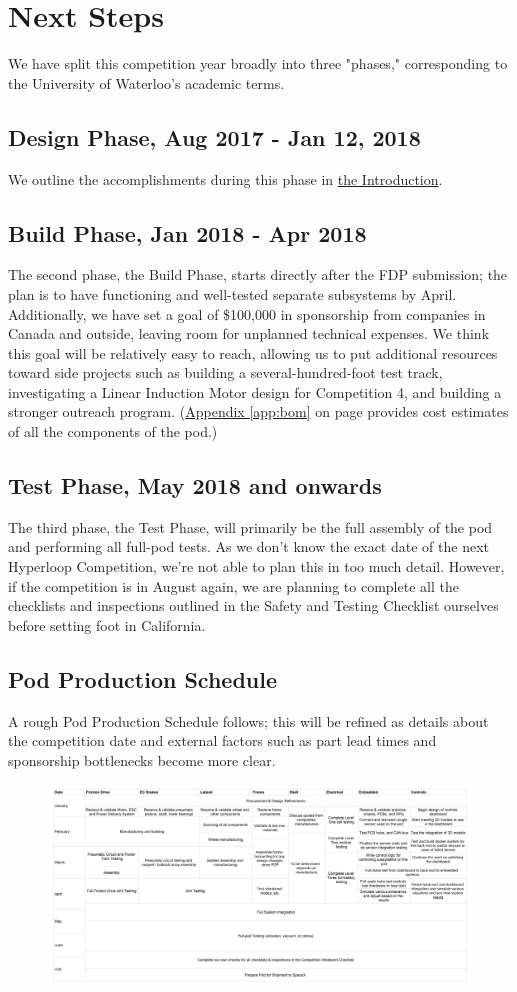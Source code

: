 \documentclass[main.tex]{subfiles}
\begin{document}
    \chapter{Next Steps}
    \label{ch:next-steps}
    We have split this competition year broadly into three "phases," corresponding to the University of Waterloo's academic terms.
    
    \section{Design Phase, Aug 2017 - Jan 12, 2018}
    We outline the accomplishments during this phase in \hyperref[ch:intro]{the Introduction}.
    
    \section{Build Phase, Jan 2018 - Apr 2018}
    The second phase, the Build Phase, starts directly after the FDP submission; the plan is to have functioning and well-tested separate subsystems by April. Additionally, we have set a goal of \$100,000 in sponsorship from companies in Canada and outside, leaving room for unplanned technical expenses. We think this goal will be relatively easy to reach, allowing us to put additional resources toward side projects such as building a several-hundred-foot test track, investigating a Linear Induction Motor design for Competition 4, and building a stronger outreach program. (\hyperref[app:bom]{Appendix \ref{app:bom}} on page \pageref{app:bom} provides cost estimates of all the components of the pod.)
    
	\section{Test Phase, May 2018 and onwards}
    The third phase, the Test Phase, will primarily be the full assembly of the pod and performing all full-pod tests. As we don't know the exact date of the next Hyperloop Competition, we're not able to plan this in too much detail. However, if the competition is in August again, we are planning to complete all the checklists and inspections outlined in the Safety and Testing Checklist ourselves before setting foot in California.
    
    \section{Pod Production Schedule}
    A rough Pod Production Schedule follows; this will be refined as details about the competition date and external factors such as part lead times and sponsorship bottlenecks become more clear.
    
    \begin{figure}
        \centering
        \includegraphics[width=\textwidth]{images/productionsched.png}
        \label{fig:pps}
    \end{figure}
\end{document}
